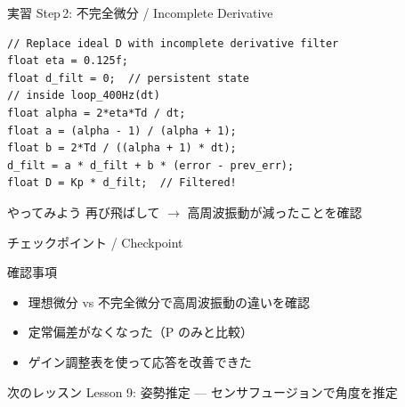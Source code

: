 \documentclass[aspectratio=169, 14pt]{beamer}
\begin{document}
\begin{frame}[fragile]{実習 Step\,2: 不完全微分 / Incomplete Derivative}
  \begin{lstlisting}[style=sfcpp, title={user\_code.cpp (D term replacement)}]
// Replace ideal D with incomplete derivative filter
float eta = 0.125f;
float d_filt = 0;  // persistent state
// inside loop_400Hz(dt)
float alpha = 2*eta*Td / dt;
float a = (alpha - 1) / (alpha + 1);
float b = 2*Td / ((alpha + 1) * dt);
d_filt = a * d_filt + b * (error - prev_err);
float D = Kp * d_filt;  // Filtered!
  \end{lstlisting}

  \begin{exampleblock}{やってみよう}
    再び飛ばして $\to$ 高周波振動が減ったことを確認
  \end{exampleblock}
\end{frame}

\begin{frame}{チェックポイント / Checkpoint}
  \begin{alertblock}{確認事項}
    \begin{itemize}
      \item[$\square$] 理想微分 vs 不完全微分で高周波振動の違いを確認
      \item[$\square$] 定常偏差がなくなった（P のみと比較）
      \item[$\square$] ゲイン調整表を使って応答を改善できた
    \end{itemize}
  \end{alertblock}

  \vspace{1em}

  \begin{block}{次のレッスン}
    Lesson 9: 姿勢推定 --- センサフュージョンで角度を推定
  \end{block}
\end{frame}
\end{document}
